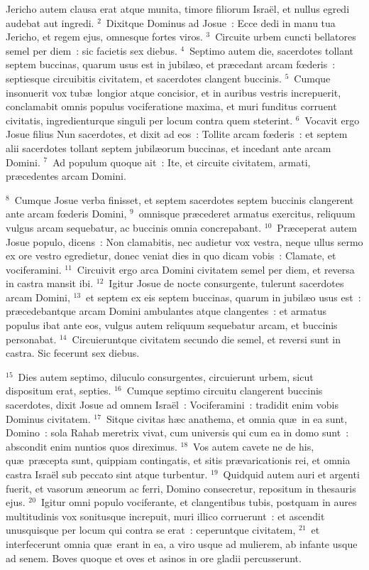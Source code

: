 \lettrine[lines=3,image=true,loversize=0.05,lraise=-0.03]{J}{}ericho autem clausa erat atque munita, timore filiorum Isra\"el, et nullus egredi audebat aut ingredi.
${}^{2}$~Dixitque Dominus ad Josue~: Ecce dedi in manu tua Jericho, et regem ejus, omnesque fortes viros.
${}^{3}$~Circuite urbem cuncti bellatores semel per diem~: sic facietis sex diebus.
${}^{4}$~Septimo autem die, sacerdotes tollant septem buccinas, quarum usus est in jubil\ae o, et pr\ae cedant arcam fœderis~: septiesque circuibitis civitatem, et sacerdotes clangent buccinis.
${}^{5}$~Cumque insonuerit vox tub\ae\ longior atque concisior, et in auribus vestris increpuerit, conclamabit omnis populus vociferatione maxima, et muri funditus corruent civitatis, ingredienturque singuli per locum contra quem steterint.
${}^{6}$~Vocavit ergo Josue filius Nun sacerdotes, et dixit ad eos~: Tollite arcam fœderis~: et septem alii sacerdotes tollant septem jubil\ae orum buccinas, et incedant ante arcam Domini.
${}^{7}$~Ad populum quoque ait~: Ite, et circuite civitatem, armati, pr\ae cedentes arcam Domini.


${}^{8}$~Cumque Josue verba finisset, et septem sacerdotes septem buccinis clangerent ante arcam fœderis Domini,
${}^{9}$~omnisque pr\ae cederet armatus exercitus, reliquum vulgus arcam sequebatur, ac buccinis omnia concrepabant.
${}^{10}$~Pr\ae ceperat autem Josue populo, dicens~: Non clamabitis, nec audietur vox vestra, neque ullus sermo ex ore vestro egredietur, donec veniat dies in quo dicam vobis~: Clamate, et vociferamini.
${}^{11}$~Circuivit ergo arca Domini civitatem semel per diem, et reversa in castra mansit ibi.
${}^{12}$~Igitur Josue de nocte consurgente, tulerunt sacerdotes arcam Domini,
${}^{13}$~et septem ex eis septem buccinas, quarum in jubil\ae o usus est~: pr\ae cedebantque arcam Domini ambulantes atque clangentes~: et armatus populus ibat ante eos, vulgus autem reliquum sequebatur arcam, et buccinis personabat.
${}^{14}$~Circuieruntque civitatem secundo die semel, et reversi sunt in castra. Sic fecerunt sex diebus.


${}^{15}$~Dies autem septimo, diluculo consurgentes, circuierunt urbem, sicut dispositum erat, septies.
${}^{16}$~Cumque septimo circuitu clangerent buccinis sacerdotes, dixit Josue ad omnem Isra\"el~: Vociferamini~: tradidit enim vobis Dominus civitatem.
${}^{17}$~Sitque civitas h\ae c anathema, et omnia qu\ae\ in ea sunt, Domino~: sola Rahab meretrix vivat, cum universis qui cum ea in domo sunt~: abscondit enim nuntios quos direximus.
${}^{18}$~Vos autem cavete ne de his, qu\ae\ pr\ae cepta sunt, quippiam contingatis, et sitis pr\ae varicationis rei, et omnia castra Isra\"el sub peccato sint atque turbentur.
${}^{19}$~Quidquid autem auri et argenti fuerit, et vasorum \ae neorum ac ferri, Domino consecretur, repositum in thesauris ejus.
${}^{20}$~Igitur omni populo vociferante, et clangentibus tubis, postquam in aures multitudinis vox sonitusque increpuit, muri illico corruerunt~: et ascendit unusquisque per locum qui contra se erat~: ceperuntque civitatem,
${}^{21}$~et interfecerunt omnia qu\ae\ erant in ea, a viro usque ad mulierem, ab infante usque ad senem. Boves quoque et oves et asinos in ore gladii percusserunt.


